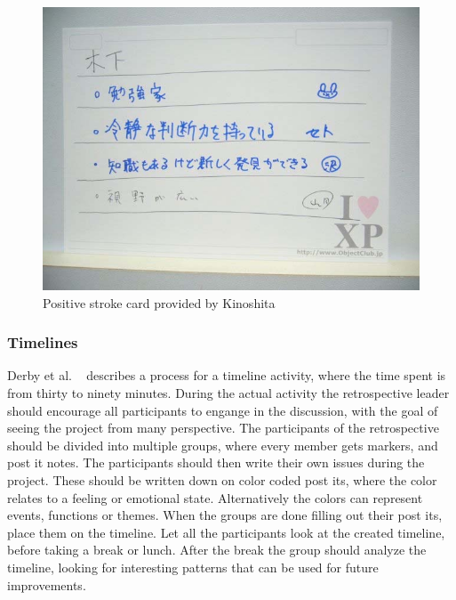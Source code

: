 \documentclass[12pt]{article}
\begin{document}
\begin{figure}[h!]
	\centering
	\includegraphics[width=\textwidth]{figures/positive-strokes.png}
	\caption{Positive stroke card provided by Kinoshita ~\cite{Kinoshita2008}}
	\label{figure:positive-strokes}
\end{figure}

\subsubsection{Timelines}
Derby et al. ~\cite{Derby2007} describes a process for a timeline activity, where the time spent is from thirty to ninety minutes. During the actual activity the retrospective leader should encourage all participants to engange in the discussion, with the goal of seeing the project from many perspective. The participants of the retrospective should be divided into multiple groups, where every member gets markers, and post it notes. The participants should then write their own issues during the project. These should be written down on color coded post its, where the color relates to a feeling or emotional state. Alternatively  the colors can represent events, functions or themes. When the groups are done filling out their post its, place them on the timeline. Let all the participants look at the created timeline, before taking a break or lunch. After the break the group should analyze the timeline, looking for interesting patterns that can be used for future improvements.
\end{document}
